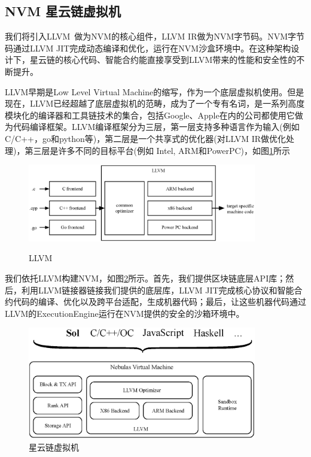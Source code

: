 \subsection{NVM 星云链虚拟机}
\label{sec:nvm}

我们将引入LLVM~\cite{llvm}做为NVM的核心组件，LLVM IR做为NVM字节码。NVM字节码通过LLVM JIT完成动态编译和优化，运行在NVM沙盒环境中。在这种架构设计下，星云链的核心代码、智能合约能直接享受到LLVM带来的性能和安全性的不断提升。

LLVM早期是Low Level Virtual Machine的缩写，作为一个底层虚拟机使用。但是现在，LLVM已经超越了底层虚拟机的范畴，成为了一个专有名词，是一系列高度模块化的编译器和工具链技术的集合，包括Google、Apple在内的公司都使用它做为代码编译框架。LLVM编译框架分为三层，第一层支持多种语言作为输入(例如C/C++，go和python等)，第二层是一个共享式的优化器(对LLVM IR做优化处理)，第三层是许多不同的目标平台(例如 Intel, ARM和PowerPC)，如图\ref{fig:llvm}所示

\begin{figure}[h]
\centering
\includegraphics[width=10cm]{./figs/llvm}
\label{fig:llvm}
\caption{LLVM}
\end{figure}

我们依托LLVM构建NVM，如图\ref{fig:nvm}所示。首先，我们提供区块链底层API库；然后，利用LLVM链接器链接我们提供的底层库，LLVM JIT完成核心协议和智能合约代码的编译、优化以及跨平台适配，生成机器代码；最后，让这些机器代码通过LLVM的ExecutionEngine运行在NVM提供的安全的沙箱环境中。

\begin{figure}[h]
\centering
\includegraphics[width=10cm]{./figs/nvm}
\caption{星云链虚拟机}
\label{fig:nvm}
\end{figure}

